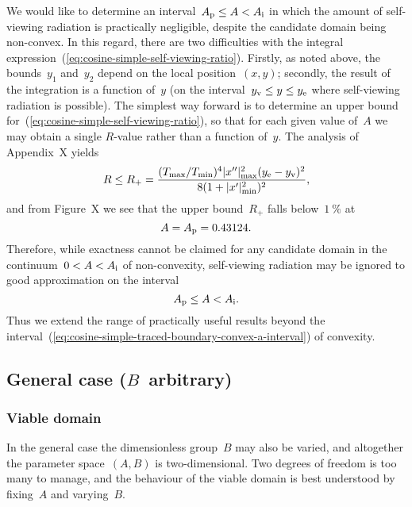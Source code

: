 We would like to determine an interval~$A_{\mathrm{p}} \le A < A_{\mathrm{i}}$
in which the amount of self-viewing radiation is practically negligible,
despite the candidate domain being non-convex.
In this regard,
there are two difficulties
with the integral expression~(\ref{eq:cosine-simple-self-viewing-ratio}).
Firstly, as noted above,
the bounds~$y_1$ and~$y_2$ depend on the local position~$(x, y)$;
secondly, the result of the integration is a function of~$y$
(on the interval~$y_{\mathrm{v}} \le y \le y_{\mathrm{e}}$
where self-viewing radiation is possible).
The simplest way forward is to determine
an upper bound for~(\ref{eq:cosine-simple-self-viewing-ratio}),
so that for each given value of~$A$
we may obtain a single $R$-value rather than a function of~$y$.
The analysis of Appendix~X yields %
\begin{equation}
  \savecontent{
    R \le R_+ =
      \frac{
        (T_{\max} / T_{\min})^4
        \abs{x''}_{\max}^2
        (y_\End - y_\view)^2
      }{
        8 (1 + \abs{x'}_{\min}^2) ^ 2
      }
  }{eq:cosine-simple-self-viewing-ratio-bound},
\end{equation}
and from Figure~X %
we see that the upper bound~$R_+$ falls below~$\SI{1}{\percent}$ at
\begin{equation}
  A = A_{\mathrm{p}} = 0.43124.
  \label{eq:cosine-simple-traced-boundary-a-practical}
\end{equation}
Therefore, while exactness cannot be claimed for any candidate domain
in the continuum~$0 < A < A_{\mathrm{i}}$ of non-convexity,
self-viewing radiation may be ignored to good approximation
on the interval
\begin{equation}
  A_{\mathrm{p}} \le A < A_{\mathrm{i}}.
  \label{eq:cosine-simple-traced-boundary-practical-a-interval}
\end{equation}
Thus we extend the range of practically useful results
beyond the interval~(\ref{eq:cosine-simple-traced-boundary-convex-a-interval})
of convexity.

\subsection{General case (\texorpdfstring{$B$~arbitrary}{B arbitrary})}
\label{sec:cartesian.cosine.general}

\subsubsection{Viable domain}
\label{sec:cartesian.cosine.general.viable}

In the general case the dimensionless group~$B$ may also be varied,
and altogether the parameter space~$(A, B)$ is two-dimensional.
Two degrees of freedom is too many to manage,
and the behaviour of the viable domain is best understood
by fixing~$A$ and varying~$B$.

